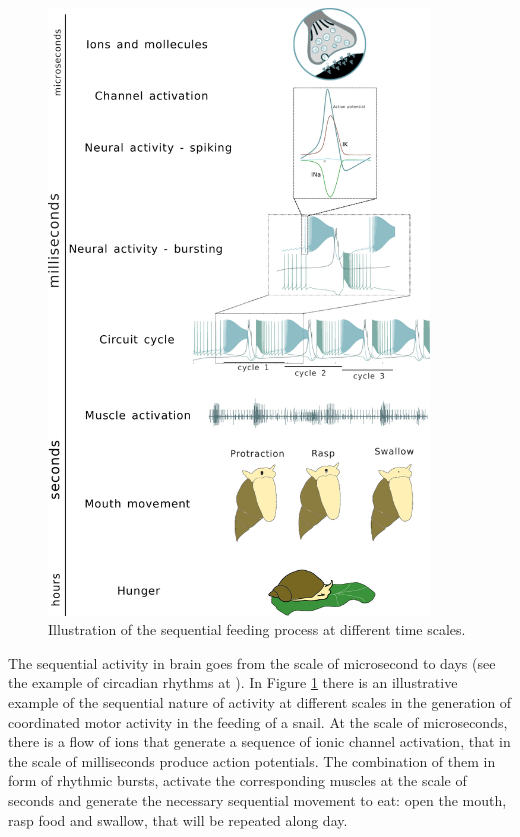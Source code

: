 \begin{figure}[hbt!]
	\centering
	\includegraphics[width=0.9\textwidth]{img/intro/time scale/time-scale-feeding.pdf}
	\caption{Illustration of the sequential feeding process at different time scales.}
	\label{fig:time scale feeding}
\end{figure}

The sequential activity in brain goes from the scale of microsecond to days (see the example of circadian rhythms at \cite{mauk_neural_2004}). In Figure \ref{fig:time scale feeding} there is an illustrative example of the sequential nature of activity at different scales in the generation of coordinated motor activity in the feeding of a snail. At the scale of microseconds, there is a flow of ions that generate a sequence of ionic channel activation, that in the scale of milliseconds produce action potentials. The combination of them in form of rhythmic bursts, activate the corresponding muscles at the scale of seconds and generate the necessary sequential movement to eat: open the mouth, rasp food and swallow, that will be repeated along day. 


